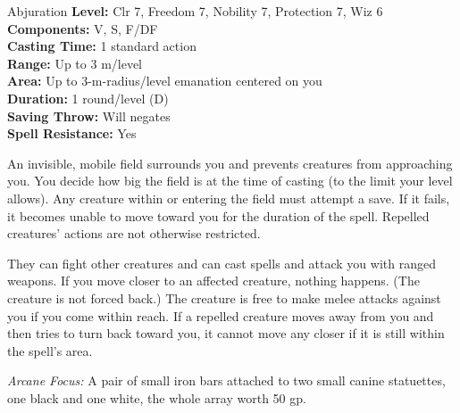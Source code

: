 {Abjuration}
{
	\textbf{Level:}
	Clr 7, Freedom 7, Nobility 7, Protection 7, Wiz 6\\
	\textbf{Components:}
	V, S, F/DF\\
	\textbf{Casting Time:}
	1 standard action\\
	\textbf{Range:}
	Up to 3 m/level\\
	\textbf{Area:}
	Up to 3-m-radius/level emanation centered on you\\
	\textbf{Duration:}
	1 round/level (D)\\
	\textbf{Saving Throw:}
	Will negates\\
	\textbf{Spell Resistance:}
	Yes\\
}
{
	An invisible, mobile field surrounds you and prevents creatures from approaching you. You decide how big the field is at the time of casting (to the limit your level allows). Any creature within or entering the field must attempt a save. If it fails, it becomes unable to move toward you for the duration of the spell. Repelled creatures' actions are not otherwise restricted.

	They can fight other creatures and can cast spells and attack you with ranged weapons. If you move closer to an affected creature, nothing happens. (The creature is not forced back.) The creature is free to make melee attacks against you if you come within reach. If a repelled creature moves away from you and then tries to turn back toward you, it cannot move any closer if it is still within the spell's area.

	\textit{Arcane Focus:}
	A pair of small iron bars attached to two small canine statuettes, one black and one white, the whole array worth 50 gp.

}
